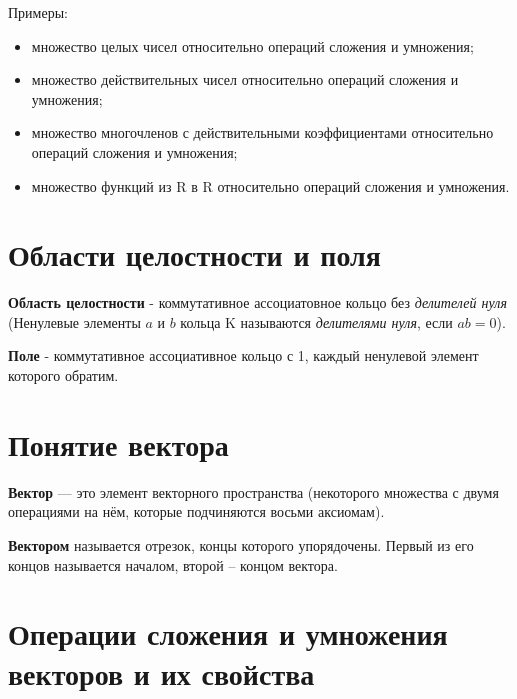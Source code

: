\documentclass[a4paper]{article}
\begin{document}
Примеры:
\begin{itemize}
\item множество целых чисел относительно операций сложения и умножения;
\item множество действительных чисел относительно операций сложения и
умножения;
\item множество многочленов с действительными коэффициентами
относительно операций сложения и умножения;
\item множество функций из R в R относительно операций сложения и умножения.
\end{itemize}

\section*{Области целостности и поля}
\textbf{Область целостности} - коммутативное ассоциатовное кольцо без \textit{делителей нуля} (Ненулевые элементы $a$ и $b$ кольца K называются \textit{делителями нуля}, если $ab = 0$).

\textbf{Поле} - коммутативное ассоциативное кольцо с 1, каждый ненулевой элемент которого обратим.




\section*{Понятие вектора}
\textbf{Вектор} — это элемент векторного пространства (некоторого множества с двумя операциями на нём, которые подчиняются восьми аксиомам).

\textbf{Вектором} называется отрезок,
концы которого упорядочены. Первый из его концов
называется началом, второй – концом вектора.

\section*{Операции сложения и умножения векторов и их свойства}
\end{document}
